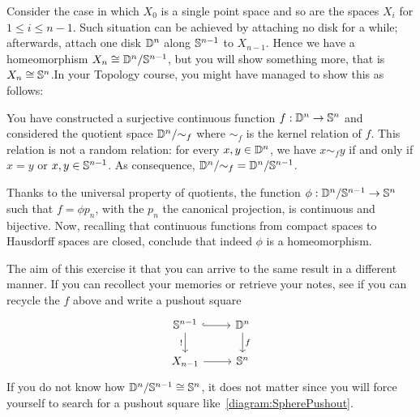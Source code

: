 \begin{exercise} Consider the case in which
  \(X_0\) is a single point space and so are the spaces \(X_i\) for
  \(1 \le i \le n-1\). Such situation can be achieved by attaching no disk
  for a while; afterwards, attach one disk \(\mathbb D^{n}\) along
  \(\mathbb S^{n-1}\) to \(X_{n-1}\). Hence we have a homeomorphism
  \(X_n \cong {\mathbb D^n}{/}{\mathbb S^{n-1}}\), but you will show something more,
  that is \(X_n \cong \mathbb S^n\).\newline In your Topology course, you might have
  managed to show this as follows:
  \begin{tcbenum}
  \item You have constructed a surjective continuous function
    \(f : \mathbb D^n \to \mathbb S^n\) and considered the quotient space
    \({\mathbb D^n}{/}{\sim_f}\) where \(\sim_f\) is the kernel relation
     of \(f\). This relation
    is not a random relation: for every \(x, y \in \mathbb D^n\), we have
    \(x \sim_f y\) if and only if \(x = y\) or
    \(x, y \in \mathbb S^{n-1}\). As consequence,
    \({\mathbb D^n}{/}{\sim_f} = {\mathbb D^n}{/}{\mathbb S^{n-1}}\).
  \item Thanks to the universal property of quotients, the function
    \(\phi : {\mathbb D^n}{/}{\mathbb S^{n-1}} \to \mathbb S^n\) such that
    \(f = \phi p_n\), with the \(p_n\) the canonical projection, is
    continuous and bijective. Now, recalling that continuous functions
    from compact spaces to Hausdorff spaces are closed, conclude that
    indeed \(\phi\) is a homeomorphism.
  \end{tcbenum}
  The aim of this exercise it that you can arrive to the same result
  in a different manner. If you can recollect your memories or
  retrieve your notes, see if you can recycle the \(f\) above and
  write a pushout square
  \begin{equation}\begin{tikzcd}
      \sph^{n-1} \ar[hookrightarrow, r] \ar["!", d, swap] & \dsc^n \ar["f", d] \\
      X_{n-1} \ar[r] & \sph^n
    \end{tikzcd}\label{diagram:SpherePushout}\end{equation}
  If you do not know how \({\mathbb D^n}{/}{\mathbb S^{n-1}} \cong \mathbb S^n\), it does
  not matter since you will force yourself to search for a pushout
  square like~\eqref{diagram:SpherePushout}.
\end{exercise}

